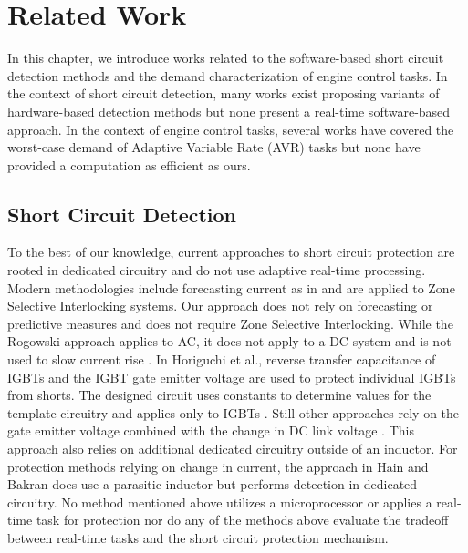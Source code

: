 \section{Related Work}   \label{chap:relatedWork}

In this chapter, we introduce works related to the software-based short circuit detection methods and the demand characterization of engine control tasks.
In the context of short circuit detection, many works exist proposing variants of hardware-based detection methods but none present a real-time software-based approach.
In the context of engine control tasks, several works have covered the worst-case demand of Adaptive Variable Rate (AVR) tasks but none have provided a computation as efficient as ours.

\subsection{Short Circuit Detection} \label{subsec:scd-relatedWork}

To the best of our knowledge, current approaches to short circuit protection are rooted in dedicated circuitry and do not use adaptive real-time processing.
Modern methodologies include forecasting current as in \cite{du_new_2014} and are applied to Zone Selective Interlocking systems.
Our approach does not rely on forecasting or predictive measures and does not require Zone Selective Interlocking.
While the Rogowski approach applies to AC, it does not apply to a DC system and is not used to slow current rise \cite{wang_new_2011}.
In Horiguchi et al., reverse transfer capacitance of IGBTs and the IGBT gate emitter voltage are used to protect individual IGBTs from shorts.
The designed circuit uses constants to determine values for the template circuitry and applies only to IGBTs \cite{horiguchi_short_2014} \cite{horiguchi_high-speed_2015}.
Still other approaches rely on the gate emitter voltage combined with the change in DC link voltage \cite{krone_fast_2015}.
This approach also relies on additional dedicated circuitry outside of an inductor.
For protection methods relying on change in current, the approach in Hain and Bakran \cite{hain_new_2016} does use a parasitic inductor but performs detection in dedicated circuitry.
No method mentioned above utilizes a microprocessor or applies a real-time task for protection nor do any of the methods above evaluate the tradeoff between real-time tasks and the short circuit protection mechanism.

